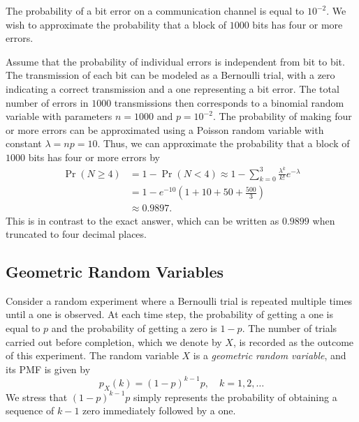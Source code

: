 \begin{example}
The probability of a bit error on a communication channel is equal to $10^{-2}$.
We wish to approximate the probability that a block of $1000$ bits has four or more errors.

Assume that the probability of individual errors is independent from bit to bit.
The transmission of each bit can be modeled as a Bernoulli trial, with a zero indicating a correct transmission and a one representing a bit error.
The total number of errors in $1000$ transmissions then corresponds to a binomial random variable with parameters $n = 1000$ and $p = 10^{-2}$.
The probability of making four or more errors can be approximated using a Poisson random variable with constant $\lambda = np = 10$.
Thus, we can approximate the probability that a block of $1000$ bits has four or more errors by
\begin{equation*}
\begin{split}
\Pr ( N \geq 4 ) &= 1 - \Pr ( N < 4 )
\approx 1 - \sum_{k=0}^3 \frac{\lambda^k}{k!} e^{-\lambda} \\
&= 1 - e^{-10} \left( 1 + 10 + 50 + \frac{500}{3} \right) \\
&\approx 0.9897 .
\end{split}
\end{equation*}
This is in contrast to the exact answer, which can be written as $0.9899$ when truncated to four decimal places.
\end{example}


\subsection{Geometric Random Variables}

Consider a random experiment where a Bernoulli trial is repeated multiple times until a one is observed.
At each time step, the probability of getting a one is equal to $p$ and the probability of getting a zero is $1-p$.
The number of trials carried out before completion, which we denote by $X$, is recorded as the outcome of this experiment.
The random variable $X$ is a \emph{geometric random variable}, and its PMF is given by 
\begin{equation*}
p_X (k) = (1-p)^{k-1} p, \quad k = 1, 2, \ldots
\end{equation*}
We stress that $(1-p)^{k-1} p$ simply represents the probability of obtaining a sequence of $k-1$ zero immediately followed by a one.

